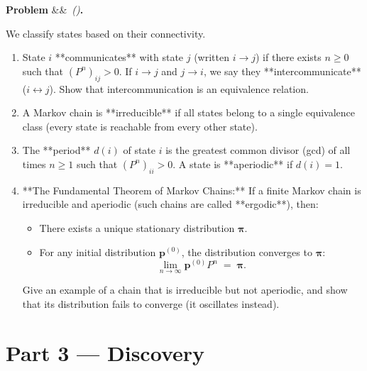 \documentclass[12pt, a4paper]{article}
\newcounter{problem}
\newenvironment{problem}[1][]{%
  \refstepcounter{problem}%
  \par\vspace{6pt}%
  \noindent\textbf{\color{MidBlue}Problem \theproblem}%
  \ifx&#1&\else\ \textit{(#1)}\fi\textbf{.}\enskip
}{\par\vspace{4pt}}
\begin{document}
\begin{problem}
\label{prob:classification}
We classify states based on their connectivity.
\begin{enumerate}[label=(\alph*), topsep=2pt]
  \item State $i$ **communicates** with state $j$ (written $i \to j$) if there exists $n \ge 0$ such that $(P^n)_{ij} > 0$. If $i \to j$ and $j \to i$, we say they **intercommunicate** ($i \leftrightarrow j$). Show that intercommunication is an equivalence relation.
  \item A Markov chain is **irreducible** if all states belong to a single equivalence class (every state is reachable from every other state).
  \item The **period** $d(i)$ of state $i$ is the greatest common divisor (gcd) of all times $n \ge 1$ such that $(P^n)_{ii} > 0$. A state is **aperiodic** if $d(i) = 1$.
  \item **The Fundamental Theorem of Markov Chains:** If a finite Markov chain is irreducible and aperiodic (such chains are called **ergodic**), then:
  \begin{itemize}[noitemsep]
    \item There exists a unique stationary distribution $\boldsymbol{\pi}$.
    \item For any initial distribution $\mathbf{p}^{(0)}$, the distribution converges to $\boldsymbol{\pi}$:
    \[
      \lim_{n\to\infty} \mathbf{p}^{(0)} P^n \;=\; \boldsymbol{\pi}.
    \]
  \end{itemize}
  Give an example of a chain that is irreducible but not aperiodic, and show that its distribution fails to converge (it oscillates instead).
\end{enumerate}
\end{problem}

\newpage

\section{Part 3 \texorpdfstring{---}{--} Discovery}
\end{document}
